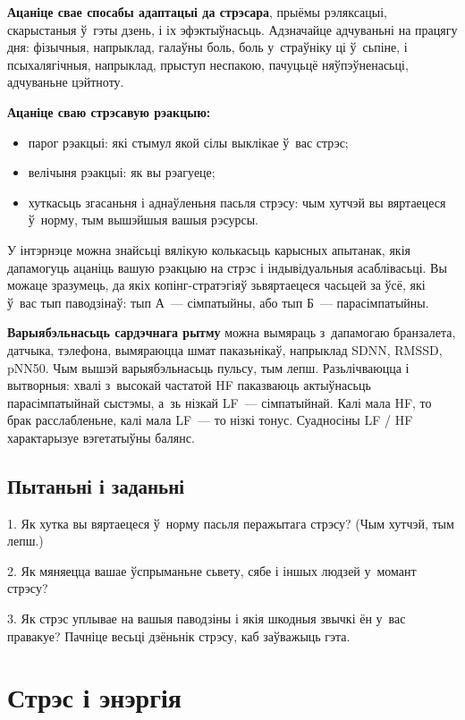 \textbf{Ацаніце свае спосабы адаптацыі да стрэсара}, прыёмы рэляксацыі, скарыстаныя ў~гэты дзень, і іх эфэктыўнасьць. Адзначайце адчуваньні на працягу дня: фізычныя, напрыклад, галаўны боль, боль у~страўніку ці ў~сьпіне, і псыхалягічныя, напрыклад, прыступ неспакою, пачуцьцё няўпэўненасьці, адчуваньне цэйтноту.

\textbf{Ацаніце сваю стрэсавую рэакцыю:}
\begin{itemize}
  \item парог рэакцыі: які стымул якой сілы выклікае ў~вас стрэс;
  \item велічыня рэакцыі: як вы рэагуеце;
  \item хуткасьць згасаньня і аднаўленьня пасьля стрэсу: чым хутчэй вы вяртаецеся ў~норму, тым вышэйшыя вашыя рэсурсы.
\end{itemize}

У інтэрнэце можна знайсьці вялікую колькасьць карысных апытанак, якія дапамогуць ацаніць вашую рэакцыю на стрэс і індывідуальныя асаблівасьці. Вы можаце зразумець, да якіх копінг-стратэгіяў зьвяртаецеся часьцей за ўсё, які ў~вас тып паводзінаў: тып А~--- сімпатыйны, або тып Б~--- парасімпатыйны.

\textbf{Варыябэльнасьць сардэчнага рытму} можна вымяраць з~дапамогаю бранзалета, датчыка, тэлефона, вымяраюцца шмат паказьнікаў, напрыклад SDNN, RMSSD, pNN50. Чым вышэй варыябэльнасьць пульсу, тым лепш. Разьлічваюцца і вытворныя: хвалі з~высокай частатой HF паказваюць актыўнасьць парасімпатыйнай сыстэмы, а~зь нізкай LF~--- сімпатыйнай. Калі мала HF, то брак расслабленьне, калі мала LF~--- то нізкі тонус. Суадносіны LF / HF характарызуе вэгетатыўны балянс.

\subsection*{Пытаньні і заданьні}

1. Як хутка вы вяртаецеся ў~норму пасьля перажытага стрэсу? (Чым хутчэй, тым лепш.)

2. Як мяняецца вашае ўспрыманьне сьвету, сябе і іншых людзей у~момант стрэсу?

3. Як стрэс уплывае на вашыя паводзіны і якія шкодныя звычкі ён у~вас правакуе? Пачніце весьці дзёньнік стрэсу, каб заўважыць гэта.


\section{Стрэс і энэргія}

